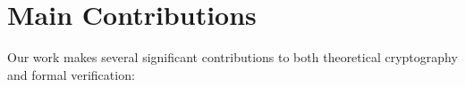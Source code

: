 





\newpage

\section{Main Contributions}

Our work makes several significant contributions to both theoretical cryptography and formal verification:

